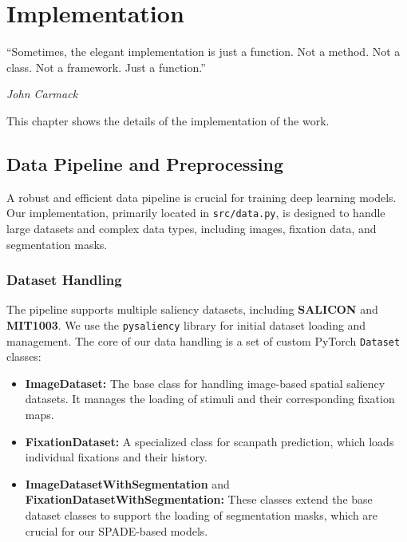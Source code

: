 \chapter{Implementation}
\label{c:implementation}

\epigraph{\enquote{Sometimes, the elegant implementation is just a function. Not a method. Not a class. Not a framework. Just a function.}}{\emph{John Carmack}}

This chapter shows the details of the implementation of the work.

\section{Data Pipeline and Preprocessing}
\label{sec:data_pipeline}

A robust and efficient data pipeline is crucial for training deep learning models. Our implementation, primarily located in \texttt{src/data.py}, is designed to handle large datasets and complex data types, including images, fixation data, and segmentation masks.

\subsection{Dataset Handling}

The pipeline supports multiple saliency datasets, including \textbf{SALICON} and \textbf{MIT1003}. We use the \texttt{pysaliency} library for initial dataset loading and management. The core of our data handling is a set of custom PyTorch \texttt{Dataset} classes:

\begin{itemize}
    \item \textbf{ImageDataset:} The base class for handling image-based spatial saliency datasets. It manages the loading of stimuli and their corresponding fixation maps.
    \item \textbf{FixationDataset:} A specialized class for scanpath prediction, which loads individual fixations and their history.
    \item \textbf{ImageDatasetWithSegmentation} and \textbf{FixationDatasetWithSegmentation:} These classes extend the base dataset classes to support the loading of segmentation masks, which are crucial for our SPADE-based models.
\end{itemize}

